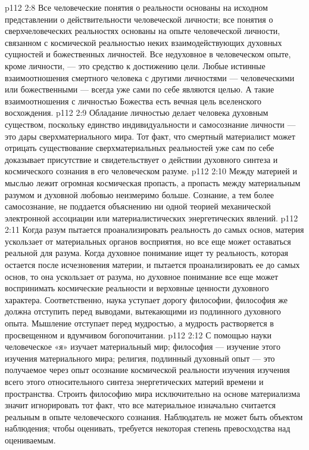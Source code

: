 \vs p112 2:8 Все человеческие понятия о реальности основаны на исходном представлении о действительности человеческой личности; все понятия о сверхчеловеческих реальностях основаны на опыте человеческой личности, связанном с космической реальностью неких взаимодействующих духовных сущностей и божественных личностей. Все недуховное в человеческом опыте, кроме личности, --- это средство к достижению цели. Любые истинные взаимоотношения смертного человека с другими личностями --- человеческими или божественными --- всегда уже сами по себе являются целью. А такие взаимоотношения с личностью Божества есть вечная цель вселенского восхождения.
\vs p112 2:9 Обладание личностью делает человека духовным существом, поскольку единство индивидуальности и самосознание личности --- это дары сверхматериального мира. Тот факт, что смертный материалист может отрицать существование сверхматериальных реальностей уже сам по себе доказывает присутствие и свидетельствует о действии духовного синтеза и космического сознания в его человеческом разуме.
\vs p112 2:10 Между материей и мыслью лежит огромная космическая пропасть, а пропасть между материальным разумом и духовной любовью неизмеримо больше. Сознание, а тем более самосознание, не поддается объяснению ни одной теорией механической электронной ассоциации или материалистических энергетических явлений.
\vs p112 2:11 \pc Когда разум пытается проанализировать реальность до самых основ, материя ускользает от материальных органов восприятия, но все еще может оставаться реальной для разума. Когда духовное понимание ищет ту реальность, которая остается после исчезновения материи, и пытается проанализировать ее до самых основ, то она ускользает от разума, но духовное понимание все еще может воспринимать космические реальности и верховные ценности духовного характера. Соответственно, наука уступает дорогу философии, философия же должна отступить перед выводами, вытекающими из подлинного духовного опыта. Мышление отступает перед мудростью, а мудрость растворяется в просвещенном и вдумчивом богопочитании.
\vs p112 2:12 С помощью науки человеческое «я» изучает материальный мир; философия --- изучение этого изучения материального мира; религия, подлинный духовный опыт --- это получаемое через опыт осознание космической реальности изучения изучения всего этого относительного синтеза энергетических материй времени и пространства. Строить философию мира исключительно на основе материализма значит игнорировать тот факт, что все материальное изначально считается реальным в опыте человеческого сознания. Наблюдатель не может быть объектом наблюдения; чтобы оценивать, требуется некоторая степень превосходства над оцениваемым.
